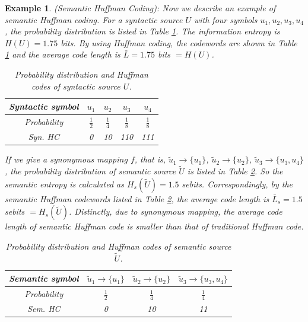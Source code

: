 \documentclass[12pt, draftclsnofoot,onecolumn]{IEEEtran}
\newtheorem{example}{\bf{Example}}
\begin{document}
\begin{example}
(Semantic Huffman Coding):
Now we describe an example of semantic Huffman coding. For a syntactic source $U$ with four symbols $u_1,u_2,u_3,u_4$, the probability distribution is listed in Table \ref{Syntactic_HC}. The information entropy is $H(U)=1.75$ bits. By using Huffman coding, the codewords are shown in Table \ref{Syntactic_HC} and the average code length is $\bar{L}=1.75$ bits $=H(U)$.

\begin{table}[tp]
\centering
\caption{Probability distribution and Huffman codes of syntactic source $U$.} \label{Syntactic_HC}
\begin{tabular}{|c|c|c|c|c|}
  \hline Syntactic symbol      &       $u_1$          &          $u_2$         &         $u_3$         &        $u_4$         \\
  \hline Probability               &  $\frac{1}{2}$    &    $\frac{1}{4}$   &   $\frac{1}{8}$   &   $\frac{1}{8}$  \\
  \hline Syn. HC  &           0              &            10             &          110            &           111         \\
  \hline
\end{tabular}
\end{table}

If we give a synonymous mapping $f$, that is, $\tilde{u}_1\to \{u_1\}$, $\tilde{u}_2\to \{u_2\}$, $\tilde{u}_3\to \{u_3,u_4\}$, the probability distribution of semantic source $\tilde{U}$ is listed in Table \ref{Semantic_HC}. So the semantic entropy is calculated as $H_s(\tilde{U})=1.5$ sebits. Correspondingly, by the semantic Huffman codewords listed in Table \ref{Semantic_HC}, the average code length is $\bar{L}_s=1.5$ sebits $=H_s(\tilde{U})$. Distinctly, due to synonymous mapping, the average code length of semantic Huffman code is smaller than that of traditional Huffman code.

\begin{table}[tp]
\centering
\caption{Probability distribution and Huffman codes of semantic source $\tilde{U}$.} \label{Semantic_HC}
\begin{tabular}{|c|c|c|c|}
  \hline Semantic symbol      &       $\tilde{u}_1\to\{u_1\}$     &          $\tilde{u}_2\to \{u_2\}$         &         $\tilde{u}_3\to \{u_3,u_4\}$   \\
  \hline Probability               &              $\frac{1}{2}$            &                 $\frac{1}{4}$                 &                $\frac{1}{4}$                  \\
  \hline Sem. HC  &                         0                    &                           10                         &                         11                           \\
  \hline
\end{tabular}
\end{table}


\end{example}
\end{document}
